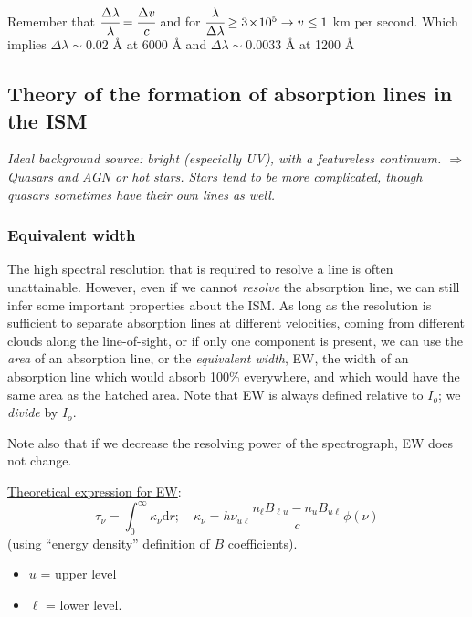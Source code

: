 \documentclass[11pt]{article}
\newcommand{\mar}[1]{\hspace{0pt}\marginpar{-\textcolor{black}{#1}-}}
\newcommand{\mynotes}[1]{{\fontfamily{cmss}\selectfont \textit{#1}}}
\begin{document}
\begin{framed}%
Remember that $\cfrac{\Delta\lambda}{\lambda} = \cfrac{\Delta{v}}{c}$
and for $\cfrac{\lambda}{\Delta\lambda} \ge 3\!\times\!10^{5}
\rightarrow v \le 1$ km per second. Which implies
$\Delta\lambda \sim 0.02$ \AA{} at 6000 \AA{} and
$\Delta\lambda \sim 0.0033$ \AA{} at 1200 \AA{}
\end{framed}

\subsection{Theory of the formation of absorption lines in the ISM}
\mynotes{Ideal background source: bright (especially UV), with a
featureless continuum. $\Rightarrow$ Quasars and AGN or hot stars.
Stars tend to be more complicated, though quasars sometimes have
their own lines as well.}

\subsubsection{Equivalent width}
The high spectral resolution that is required to resolve a line is often
unattainable. However, even if we cannot \emph{resolve} the absorption line, we
can still infer some important properties about the ISM. As long as the
resolution is sufficient to separate absorption lines at different velocities,
coming from different clouds along the line-of-sight, or if only one component
is present, we can use the \emph{area} of an absorption line, or the
\textit{equivalent width}, EW, the width of an absorption line which would
absorb 100\% everywhere, and which would have the same area as the hatched
area. Note that EW is always defined relative to $I_{o}$; we \emph{divide} by
$I_{o}$.

\mar{91}Note also that if we decrease the resolving power of the
spectrograph, EW does not change.

\newpage
\underline{Theoretical expression for EW}:
\[
    \tau_{\nu} = \int_{0}^{\infty}{\kappa_{\nu}\mathrm{d}r};\quad
    \kappa_{\nu} = h\nu_{u\ell}
    \frac{n_{\ell}B_{\ell{u}}-n_{u}B_{u\ell}}{c}\phi(\nu)
    \]
(using ``energy density'' definition of $B$ coefficients).
\begin{itemize}
    \item $u$ = upper level
    \item $\ell$ = lower level.
\end{itemize}
\end{document}
